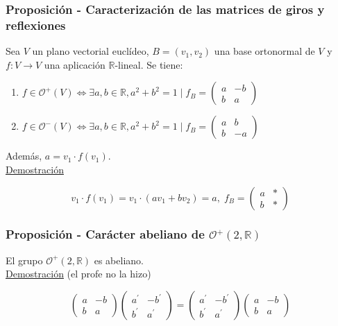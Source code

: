 \documentclass[12pt, a4paper, ones, notitlepage, openany,titlepage]{article}
\newcommand{\demostracion}{\noindent\underline{Demostración}}
\begin{document}
\subsubsection{Proposición - Caracterización de las matrices de giros y reflexiones}
Sea $V$ un plano vectorial euclídeo, $B=\left(v_{1}, v_{2}\right)$ una base ortonormal de $V$ y $f: V \rightarrow V$ una aplicación $\mathbb{R}$-lineal. Se tiene:
\begin{enumerate}[label=(\arabic*)]
	\item $\displaystyle f \in \mathcal{O}^{+}(V) \Longleftrightarrow \exists a, b \in \mathbb{R}, a^{2}+b^{2}=1 \mid f_{B}=\left(\begin{array}{rr}
		a & -b \\
		b & a
	\end{array}\right)$
	\item $\displaystyle f \in \mathcal{O}^{-}(V) \Longleftrightarrow \exists a, b \in \mathbb{R}, a^{2}+b^{2}=1 \mid f_{B}=\left(\begin{array}{rr}
		a & b \\
		b & -a
	\end{array}\right)$
\end{enumerate}

\noindent Además, $a=v_{1} \cdot f\left(v_{1}\right)$.\\

\demostracion 

$$
v_1 \cdot f(v_1) = v_1 \cdot (av_1 + bv_2) = a, \; f_B =
\begin{pmatrix}
	a & * \\
	b & *
\end{pmatrix}
$$

\subsubsection{Proposición - Carácter abeliano de $\mathcal{O}^{+}(2, \mathbb{R})$}
\noindent El grupo $\mathcal{O}^{+}(2, \mathbb{R})$ es abeliano.\\

\demostracion \; (el profe no la hizo)

$$
\left(\begin{array}{rr}
	a & -b \\
	b & a
\end{array}\right)\left(\begin{array}{rr}
	a^{\prime} & -b^{\prime} \\
	b^{\prime} & a^{\prime}
\end{array}\right)=\left(\begin{array}{rr}
	a^{\prime} & -b^{\prime} \\
	b^{\prime} & a^{\prime}
\end{array}\right)\left(\begin{array}{rr}
	a & -b \\
	b & a
\end{array}\right)
$$
\end{document}
